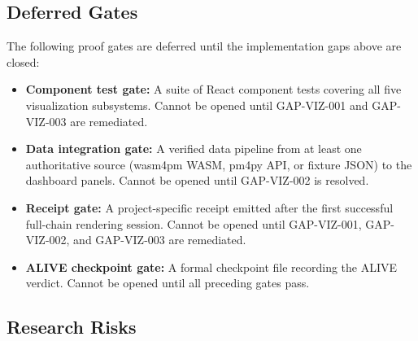 \subsection{Deferred Gates}
\label{sec:experiments-visualizer-nextjs-open-deferred}

The following proof gates are deferred until the implementation gaps above are closed:

\begin{itemize}
  \item \textbf{Component test gate:} A suite of React component tests covering all five
        visualization subsystems. Cannot be opened until GAP-VIZ-001 and GAP-VIZ-003
        are remediated.
  \item \textbf{Data integration gate:} A verified data pipeline from at least one
        authoritative source (wasm4pm WASM, pm4py API, or fixture JSON) to the dashboard
        panels. Cannot be opened until GAP-VIZ-002 is resolved.
  \item \textbf{Receipt gate:} A project-specific receipt emitted after the first
        successful full-chain rendering session. Cannot be opened until GAP-VIZ-001,
        GAP-VIZ-002, and GAP-VIZ-003 are remediated.
  \item \textbf{ALIVE checkpoint gate:} A formal checkpoint file recording the ALIVE
        verdict. Cannot be opened until all preceding gates pass.
\end{itemize}

\subsection{Research Risks}
\label{sec:experiments-visualizer-nextjs-open-risks}


